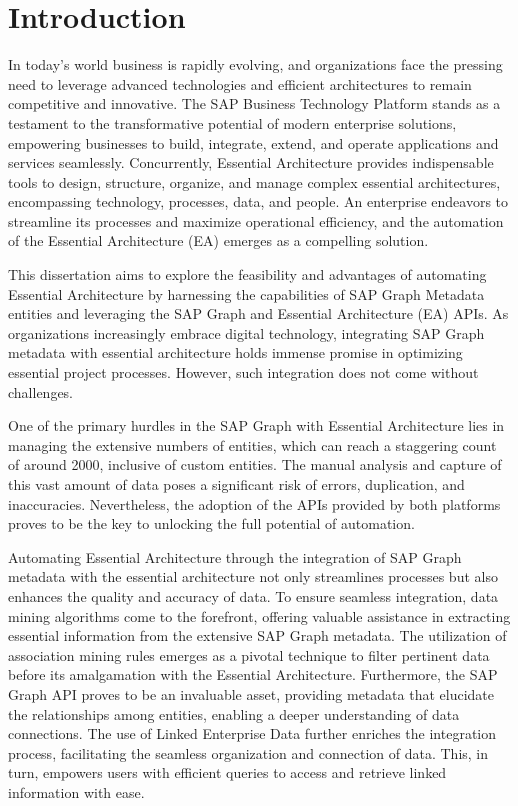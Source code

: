 \documentclass{article}
\begin{document}
\section{Introduction}
In today’s world business is rapidly evolving, and organizations face the pressing need to leverage advanced technologies and efficient architectures to remain competitive and innovative. The SAP Business Technology Platform stands as a testament to the transformative potential of modern enterprise solutions, empowering businesses to build, integrate, extend, and operate applications and services seamlessly. Concurrently, Essential Architecture provides indispensable tools to design, structure, organize, and manage complex essential architectures, encompassing technology, processes, data, and people. An enterprise endeavors to streamline its processes and maximize operational efficiency, and the automation of the Essential Architecture (EA) emerges as a compelling solution.

This dissertation aims to explore the feasibility and advantages of automating Essential Architecture by harnessing the capabilities of SAP Graph Metadata entities and leveraging the SAP Graph and Essential Architecture (EA) APIs. As organizations increasingly embrace digital technology, integrating SAP Graph metadata with essential architecture holds immense promise in optimizing essential project processes. However, such integration does not come without challenges.

One of the primary hurdles in the SAP Graph with Essential Architecture lies in managing the extensive numbers of entities, which can reach a staggering count of around 2000, inclusive of custom entities. The manual analysis and capture of this vast amount of data poses a significant risk of errors, duplication, and inaccuracies. Nevertheless, the adoption of the APIs provided by both platforms proves to be the key to unlocking the full potential of automation.

Automating Essential Architecture through the integration of SAP Graph metadata with the essential architecture not only streamlines processes but also enhances the quality and accuracy of data. To ensure seamless integration, data mining algorithms come to the forefront, offering valuable assistance in extracting essential information from the extensive SAP Graph metadata. The utilization of association mining rules emerges as a pivotal technique to filter pertinent data before its amalgamation with the Essential Architecture. Furthermore, the SAP Graph API proves to be an invaluable asset, providing metadata that elucidate the relationships among entities, enabling a deeper understanding of data connections. The use of Linked Enterprise Data further enriches the integration process, facilitating the seamless organization and connection of data. This, in turn, empowers users with efficient queries to access and retrieve linked information with ease.
\end{document}

